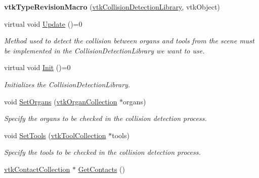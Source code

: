 \begin{DoxyCompactItemize}
\item 
\hypertarget{classvtkCollisionDetectionLibrary_a2acb486cd6986078710736aa56725fa2}{
{\bfseries vtkTypeRevisionMacro} (\hyperlink{classvtkCollisionDetectionLibrary}{vtkCollisionDetectionLibrary}, vtkObject)}
\label{classvtkCollisionDetectionLibrary_a2acb486cd6986078710736aa56725fa2}

\item 
virtual void \hyperlink{classvtkCollisionDetectionLibrary_ae3ce4d5055eee783a8bf9f06f62f5667}{Update} ()=0
\begin{DoxyCompactList}\small\item\em Method used to detect the collision between organs and tools from the scene must be implemented in the CollisionDetectionLibrary we want to use. \item\end{DoxyCompactList}\item 
virtual void \hyperlink{classvtkCollisionDetectionLibrary_ac29256d189958f001608f8f5d170a73c}{Init} ()=0
\begin{DoxyCompactList}\small\item\em Initializes the CollisionDetectionLibrary. \item\end{DoxyCompactList}\item 
\hypertarget{classvtkCollisionDetectionLibrary_ada19fa3bacecc30fac20ea0b81b5a3cc}{
void \hyperlink{classvtkCollisionDetectionLibrary_ada19fa3bacecc30fac20ea0b81b5a3cc}{SetOrgans} (\hyperlink{classvtkOrganCollection}{vtkOrganCollection} $\ast$organs)}
\label{classvtkCollisionDetectionLibrary_ada19fa3bacecc30fac20ea0b81b5a3cc}

\begin{DoxyCompactList}\small\item\em Specify the organs to be checked in the collision detection process. \item\end{DoxyCompactList}\item 
\hypertarget{classvtkCollisionDetectionLibrary_a9ce6f59fdb8ffbd87f9faa396d001413}{
void \hyperlink{classvtkCollisionDetectionLibrary_a9ce6f59fdb8ffbd87f9faa396d001413}{SetTools} (\hyperlink{classvtkToolCollection}{vtkToolCollection} $\ast$tools)}
\label{classvtkCollisionDetectionLibrary_a9ce6f59fdb8ffbd87f9faa396d001413}

\begin{DoxyCompactList}\small\item\em Specify the tools to be checked in the collision detection process. \item\end{DoxyCompactList}\item 
\hypertarget{classvtkCollisionDetectionLibrary_a2e6f361824a6264e506fed2737f03819}{
\hyperlink{classvtkContactCollection}{vtkContactCollection} $\ast$ \hyperlink{classvtkCollisionDetectionLibrary_a2e6f361824a6264e506fed2737f03819}{GetContacts} ()}
\label{classvtkCollisionDetectionLibrary_a2e6f361824a6264e506fed2737f03819}


\end{DoxyCompactItemize}
